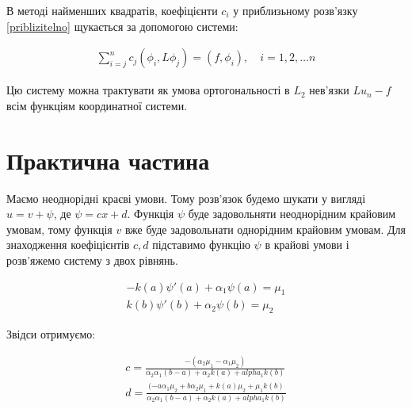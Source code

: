 В методі найменших квадратів, коефіцієнти $c_i$ у приблизьному розв'язку \ref{priblizitelno} щукається за допомогою системи:

\begin{equation} 
\begin{split}
\sum_{i=j}^{n} c_j (\phi_i, L\phi_j) = (f, \phi_i), \quad i = 1, 2, \dots n
\end{split}					
\end{equation}

Цю систему можна трактувати як умова ортогональності в $L_2$ нев'язки $Lu_n - f$ всім функціям координатної системи.


\section{Практична частина}


\bigskip

Маємо неоднорідні краєві умови. Тому розв'язок будемо шукати у вигляді $u = v + \psi$, де $\psi = cx + d$. Функція $\psi$ буде задовольняти неоднорідним крайовим умовам, тому функція $v$ вже буде задовольнати однорідним крайовим умовам. Для знаходження коефіцієнтів $c,d$ підставимо функцію $\psi$ в крайові умови і розв'яжемо систему з двох рівнянь.

	\begin{equation*}
	\begin{split}
	-k(a)\psi'(a) + \alpha_1 \psi(a) = \mu_1 \\ 
	k(b)\psi'(b) + \alpha_2 \psi(b) = \mu_2
	\end{split}
	\end{equation*}

Звідси отримуємо:

	\begin{equation}
	\begin{split}
c = \frac{-(\alpha_2 \mu_1 - \alpha_1 \mu_2)}{\alpha_2\alpha_1(b-a) + \alpha_2 k(a) + alpha_1 k(b)} \\
d = \frac{(-a \alpha_1 \mu_2 + b \alpha_2 \mu_1 + k(a) \mu_2 + \mu_1 k(b)}{\alpha_2\alpha_1(b-a) + \alpha_2 k(a) + alpha_1 k(b)}
	\end{split}
	\end{equation}
	
